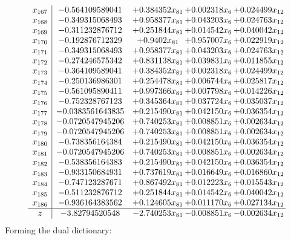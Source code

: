 \documentclass[11pt]{article}
\begin{document}
\[\begin{array}{c| c c@{\hskip 2pt} c@{\hskip 2pt} c@{\hskip 2pt} }
 x_{167}   &  -0.564109589041 & + 0.384352 x_{81} & + 0.002318 x_{6} & + 0.024499 x_{12}\\
 x_{168}   &  -0.349315068493 & + 0.958377 x_{81} & + 0.043203 x_{6} & + 0.024763 x_{12}\\
 x_{169}   &  -0.311232876712 & + 0.251844 x_{81} & + 0.014542 x_{6} & + 0.040042 x_{12}\\
 x_{170}   &  -0.192876712329 & + 0.9402 x_{81} & + 0.957007 x_{6} & + 0.022919 x_{12}\\
 x_{171}   &  -0.349315068493 & + 0.958377 x_{81} & + 0.043203 x_{6} & + 0.024763 x_{12}\\
 x_{172}   &  -0.274246575342 & + 0.831138 x_{81} & + 0.039831 x_{6} & + 0.011855 x_{12}\\
 x_{173}   &  -0.364109589041 & + 0.384352 x_{81} & + 0.002318 x_{6} & + 0.024499 x_{12}\\
 x_{174}   &  -0.250136986301 & + 0.254478 x_{81} & + 0.006744 x_{6} & + 0.025817 x_{12}\\
 x_{175}   &  -0.561095890411 & + 0.997366 x_{81} & + 0.007798 x_{6} & + 0.014226 x_{12}\\
 x_{176}   &  -0.752328767123 & + 0.345364 x_{81} & + 0.037724 x_{6} & + 0.035037 x_{12}\\
 x_{177}   &  -0.0383561643835 & + 0.215490 x_{81} & + 0.042150 x_{6} & + 0.036354 x_{12}\\
 x_{178}   &  -0.0720547945206 & + 0.740253 x_{81} & + 0.008851 x_{6} & + 0.002634 x_{12}\\
 x_{179}   &  -0.0720547945206 & + 0.740253 x_{81} & + 0.008851 x_{6} & + 0.002634 x_{12}\\
 x_{180}   &  -0.738356164384 & + 0.215490 x_{81} & + 0.042150 x_{6} & + 0.036354 x_{12}\\
 x_{181}   &  -0.0720547945206 & + 0.740253 x_{81} & + 0.008851 x_{6} & + 0.002634 x_{12}\\
 x_{182}   &  -0.538356164383 & + 0.215490 x_{81} & + 0.042150 x_{6} & + 0.036354 x_{12}\\
 x_{183}   &  -0.933150684931 & + 0.737619 x_{81} & + 0.016649 x_{6} & + 0.016860 x_{12}\\
 x_{184}   &  -0.747123287671 & + 0.867492 x_{81} & + 0.012223 x_{6} & + 0.015543 x_{12}\\
 x_{185}   &  -0.511232876712 & + 0.251844 x_{81} & + 0.014542 x_{6} & + 0.040042 x_{12}\\
 x_{186}   &  -0.936164383562 & + 0.124605 x_{81} & + 0.011170 x_{6} & + 0.027134 x_{12}\\
\hline
z    &  -3.82794520548 & -2.740253 x_{81} & -0.008851 x_{6} & -0.002634 x_{12}\\
\end{array}\]
Forming the dual dictionary:
\end{document}
